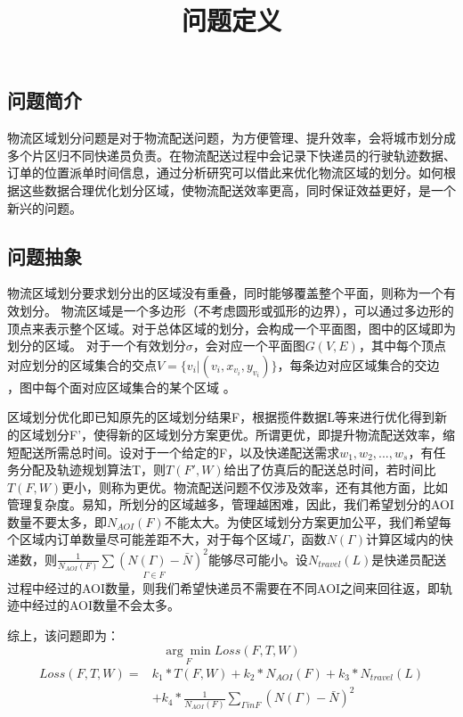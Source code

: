 \documentclass{article} %
\title{问题定义}
\begin{document}
	\maketitle
	\subsection{问题简介}
	物流区域划分问题是对于物流配送问题，为方便管理、提升效率，会将城市划分成多个片区归不同快递员负责。在物流配送过程中会记录下快递员的行驶轨迹数据、订单的位置派单时间信息，通过分析研究可以借此来优化物流区域的划分。如何根据这些数据合理优化划分区域，使物流配送效率更高，同时保证效益更好，是一个新兴的问题。
	
	
	\subsection{问题抽象}
	物流区域划分要求划分出的区域没有重叠，同时能够覆盖整个平面，则称为一个有效划分。
	物流区域是一个多边形（不考虑圆形或弧形的边界），可以通过多边形的顶点来表示整个区域。对于总体区域的划分，会构成一个平面图，图中的区域即为划分的区域。
	对于一个有效划分$\sigma$，会对应一个平面图$G(V,E)$，其中每个顶点对应划分的区域集合的交点$V=\{v_i|(v_i,x_{v_i},y_{v_i})\}$，每条边对应区域集合的交边 ，图中每个面对应区域集合的某个区域 。
	
	\iffalse
	快递员轨迹信息是一组坐标和时间的集合，对于确定的AOI划分，我们也能够知道每时刻快递员所处AOI号。订单信息则是订单送达的位置与派单时刻以及所处AOI号构成。即为：
	L={(x,y,t,i)|(x,y)\in AOI_i}
	\fi
	
	\begin{itemize}
	区域划分优化即已知原先的区域划分结果F，根据揽件数据L等来进行优化得到新的区域划分F'，使得新的区域划分方案更优。所谓更优，即提升物流配送效率，缩短配送所需总时间。设对于一个给定的F，以及快递配送需求$w_1,w_2,...,w_s$，有任务分配及轨迹规划算法T，则$T(F',W)$给出了仿真后的配送总时间，若时间比$T(F,W)$更小，则称为更优。物流配送问题不仅涉及效率，还有其他方面，比如管理复杂度。易知，所划分的区域越多，管理越困难，因此，我们希望划分的AOI数量不要太多，即$N_{AOI}(F)$不能太大。为使区域划分方案更加公平，我们希望每个区域内订单数量尽可能差距不大，对于每个区域$\varGamma$，函数$N(\varGamma)$计算区域内的快递数，则$\frac{1}{N_{AOI}(F)} \underset{\varGamma \in F}{\sum{(N(\varGamma)-\bar{N})^2}}$能够尽可能小。设$N_{travel}(L)$是快递员配送过程中经过的AOI数量，则我们希望快递员不需要在不同AOI之间来回往返，即轨迹中经过的AOI数量不会太多。	
	\end{itemize}
	
	综上，该问题即为：
	\begin{equation}
	\underset{F}{\arg \min} Loss(F,T,W)
	\end{equation}
	\begin{equation}
	\begin{split}
	Loss(F,T,W)= & k_1*T(F,W)+k_2*N_{AOI}(F)+k_3*N_{travel}(L)  \\
	& +k_4*\frac{1}{N_{AOI}(F)}\sum_{\varGamma in F}{(N(\varGamma)-\bar{N})^2}
	\end{split}
	\end{equation}
	
\end{document}

